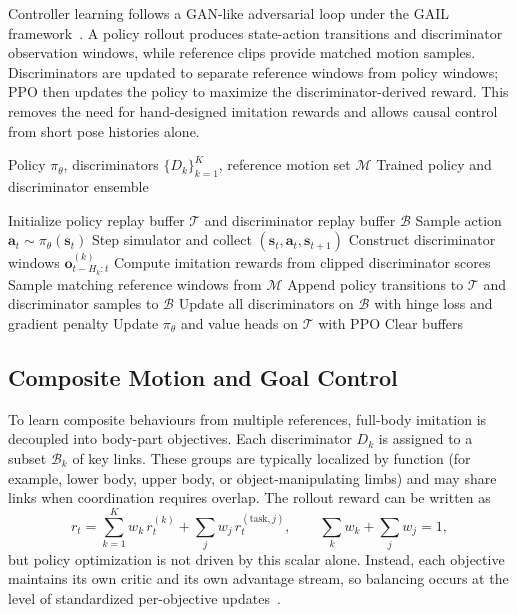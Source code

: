 Controller learning follows a GAN-like adversarial loop under the GAIL framework~\cite{gail2016, iccgan2021}. A policy rollout produces state-action transitions and discriminator observation windows, while reference clips provide matched motion samples. Discriminators are updated to separate reference windows from policy windows; PPO then updates the policy to maximize the discriminator-derived reward. This removes the need for hand-designed imitation rewards and allows causal control from short pose histories alone.

\begin{algorithm}
\caption{Adversarial Controller Learning}
\label{alg:controller_learning}
\begin{algorithmic}[1]
\Require Policy $\pi_\theta$, discriminators $\{D_k\}_{k=1}^K$, reference motion set $\mathcal{M}$
\Ensure Trained policy and discriminator ensemble

\State Initialize policy replay buffer $\mathcal{T}$ and discriminator replay buffer $\mathcal{B}$
        \State Sample action $\mathbf{a}_t \sim \pi_\theta(\mathbf{s}_t)$
        \State Step simulator and collect $(\mathbf{s}_t,\mathbf{a}_t,\mathbf{s}_{t+1})$
        \State Construct discriminator windows $\mathbf{o}_{t-H_k:t}^{(k)}$
        \State Compute imitation rewards from clipped discriminator scores
        \State Sample matching reference windows from $\mathcal{M}$
        \State Append policy transitions to $\mathcal{T}$ and discriminator samples to $\mathcal{B}$
    \EndFor
    \State Update all discriminators on $\mathcal{B}$ with hinge loss and gradient penalty
    \State Update $\pi_\theta$ and value heads on $\mathcal{T}$ with PPO
    \State Clear buffers
\EndWhile
\end{algorithmic}
\end{algorithm}

\subsection{Composite Motion and Goal Control}
\label{sec:composite}

To learn composite behaviours from multiple references, full-body imitation is decoupled into body-part objectives. Each discriminator $D_k$ is assigned to a subset $\mathcal{B}_k$ of key links. These groups are typically localized by function (for example, lower body, upper body, or object-manipulating limbs) and may share links when coordination requires overlap. The rollout reward can be written as
\[
    r_t = \sum_{k=1}^{K} w_k\, r_t^{(k)} + \sum_{j} w_j\, r_t^{(\text{task},j)},
    \qquad \sum_k w_k + \sum_j w_j = 1,
\]
but policy optimization is not driven by this scalar alone. Instead, each objective maintains its own critic and its own advantage stream, so balancing occurs at the level of standardized per-objective updates~\cite{composite2023}.

